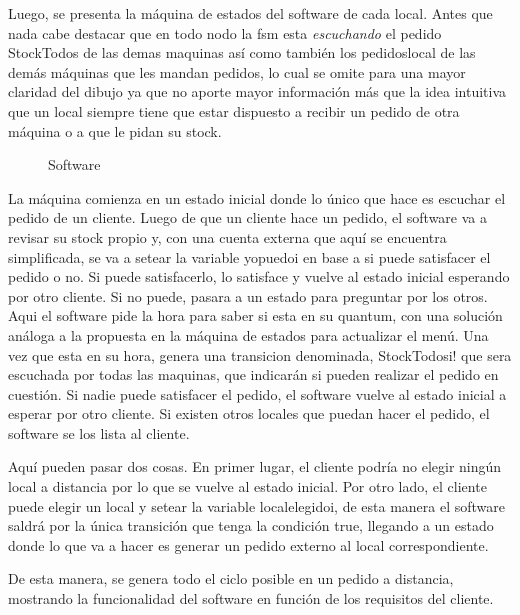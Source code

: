 \documentclass[a4paper,10pt]{article}
\begin{document}
Luego, se presenta la m\'aquina de estados del software de cada local.
Antes que nada cabe destacar que en todo nodo la fsm esta \emph{escuchando} el pedido StockTodos de las demas maquinas as\'i como tambi\'en los pedidoslocal de las dem\'as m\'aquinas que les mandan pedidos, lo cual se omite para una mayor claridad del dibujo ya que no aporte mayor informaci\'on m\'as que la idea intuitiva que un local siempre tiene que estar dispuesto a recibir un pedido de otra m\'aquina o a que le pidan su stock.

\begin{figure}[H]
\centering
{}
\caption{Software}
\end{figure}

La m\'aquina comienza en un estado inicial donde lo \'unico que hace es escuchar el pedido de un cliente. Luego de que un cliente hace un pedido, el software va a revisar su stock propio y, con una cuenta externa que aqu\'i se encuentra simplificada, se va a setear la variable yopuedoi en base a si puede satisfacer el pedido o no. Si puede satisfacerlo, lo satisface y vuelve al estado inicial esperando por otro cliente. Si no puede, pasara a un estado para preguntar por los otros. Aqui el software pide la hora para saber si esta en su quantum, con una soluci\'on an\'aloga a la propuesta en la m\'aquina de estados para actualizar el men\'u. Una vez que esta en su hora, genera una transicion denominada, StockTodosi! que sera escuchada por todas las maquinas, que indicar\'an si pueden realizar el pedido en cuesti\'on. Si nadie puede satisfacer el pedido, el software vuelve al estado inicial a esperar por otro cliente. Si existen otros locales que puedan hacer el pedido, el software se los lista al cliente.

Aqu\'i pueden pasar dos cosas. En primer lugar, el cliente podr\'ia no elegir ning\'un local a distancia por lo que se vuelve al estado inicial. Por otro lado, el cliente puede elegir un local y setear la variable localelegidoi, de esta manera el software saldr\'a por la \'unica transici\'on que tenga la condici\'on true, llegando a un estado donde lo que va a hacer es generar un pedido externo al local correspondiente.

De esta manera, se genera todo el ciclo posible en un pedido a distancia, mostrando la funcionalidad del software en funci\'on de los requisitos del cliente.




\newpage
\end{document}
